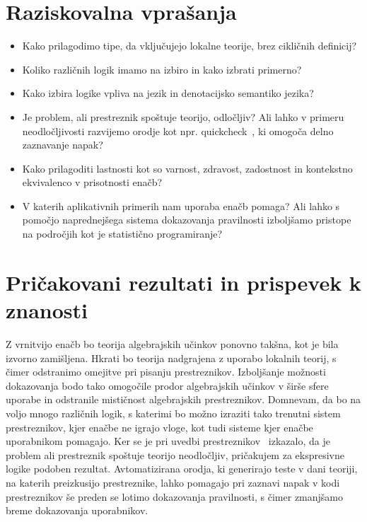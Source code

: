 \documentclass{article}
\begin{document}
\section*{Raziskovalna vprašanja}

\begin{itemize}
  \item Kako prilagodimo tipe, da vključujejo lokalne teorije, brez cikličnih definicij?
  \item Koliko različnih logik imamo na izbiro in kako izbrati primerno?
  \item Kako izbira logike vpliva na jezik in denotacijsko semantiko jezika?
  \item Je problem, ali prestreznik spoštuje teorijo, odločljiv? Ali lahko v primeru neodločljivosti razvijemo orodje kot npr. quickcheck~\cite{DBLP:conf/icfp/ClaessenH00}, ki omogoča delno zaznavanje napak?
  \item Kako prilagoditi lastnosti kot so varnost, zdravost, zadostnost in kontekstno ekvivalenco v prisotnosti enačb?
  \item V katerih aplikativnih primerih nam uporaba enačb pomaga? Ali lahko s pomočjo naprednejšega sistema dokazovanja pravilnosti izboljšamo pristope na področjih kot je statistično programiranje?
\end{itemize}


\section*{Pričakovani rezultati in prispevek k znanosti}

Z vrnitvijo enačb  bo teorija algebrajskih učinkov ponovno takšna, kot je bila izvorno zamišljena. Hkrati bo teorija nadgrajena z uporabo lokalnih teorij, s čimer odstranimo omejitve pri pisanju prestreznikov. Izboljšanje možnosti dokazovanja bodo tako omogočile prodor algebrajskih učinkov v širše sfere uporabe in odstranile mističnost algebrajskih prestreznikov. Domnevam, da bo na voljo mnogo različnih logik, s katerimi bo možno izraziti tako trenutni sistem prestreznikov, kjer enačbe ne igrajo vloge, kot tudi sisteme kjer enačbe uporabnikom pomagajo. Ker se je pri uvedbi prestreznikov~\cite{DBLP:conf/esop/PlotkinP09} izkazalo, da je problem ali prestreznik spoštuje teorijo neodločljiv, pričakujem za ekspresivne logike podoben rezultat. Avtomatizirana orodja, ki generirajo teste v dani teoriji, na katerih preizkusijo prestreznike, lahko pomagajo pri zaznavi napak v kodi prestreznikov še preden se lotimo dokazovanja pravilnosti, s čimer zmanjšamo breme dokazovanja uporabnikov.


\renewcommand\refname{Literatura}


\end{document}
